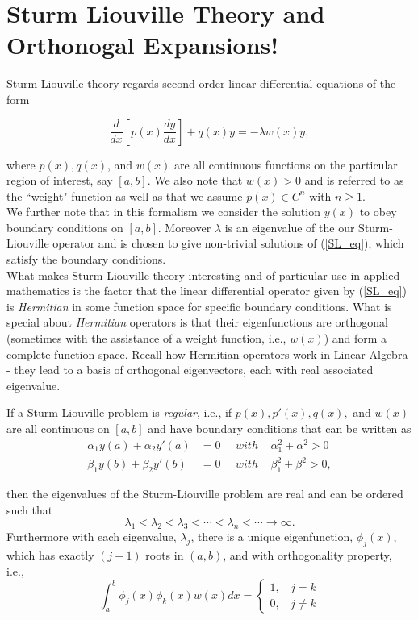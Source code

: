 \graphicspath{{./Sturm_Liouville/}}

\section{Sturm Liouville Theory and Orthonogal Expansions!}

Sturm-Liouville theory regards second-order linear differential equations of the form

\begin{equation}
\label{SL_eq} \frac{d}{dx} \left[ p(x) \frac{dy}{dx} \right] + q(x) y = -\lambda w(x) y,
\end{equation} 

where $p(x), q(x)$, and $w(x)$ are  all continuous functions on the particular region of interest, say $[a,b]$. We also note that $w(x)>0$ and is referred to as the ``weight" function as well as that we assume $p(x)\in C^n$ with $n\geq 1$.\\

We further note that in this formalism we consider the solution $y(x)$ to obey boundary conditions on $[a,b]$. Moreover $\lambda$ is an eigenvalue of the our Sturm-Liouville operator and is chosen to give non-trivial solutions of (\ref{SL_eq}), which satisfy the boundary conditions.   \\

What makes Sturm-Liouville theory interesting and of particular use in applied mathematics is the factor that the linear differential operator given by (\ref{SL_eq}) is \emph{Hermitian} in some function space for specific boundary conditions.  What is special about \emph{Hermitian} operators is that their eigenfunctions are orthogonal (sometimes with the assistance of a weight function, i.e., $w(x)$) and form a complete function space. Recall how Hermitian operators work in Linear Algebra - they lead to a basis of orthogonal eigenvectors, each with real associated eigenvalue. \\


\begin{theorem}
\label{SL_theorem} If a Sturm-Liouville problem is \emph{regular}, i.e., if $p(x), p'(x), q(x),$ and $w(x)$ are all continuous on $[a,b]$ and have boundary conditions that can be written as 
\begin{align}
\label{SL_bcs} \alpha_1 y(a) + \alpha_2 y'(a) &= 0 \ \ \ \ \ \ with \ \ \ \ \ \alpha_1^2+\alpha^2>0 \\
\beta_1 y(b) + \beta_2 y'(b) &= 0 \ \ \ \ \ \ with \ \ \ \ \ \beta_1^2+\beta^2>0, 
\end{align}

then the eigenvalues of the Sturm-Liouville problem are real and can be ordered such that
$$\lambda_1 < \lambda_2 < \lambda_3 < \cdots < \lambda_n < \cdots \rightarrow \infty.$$
Furthermore with each eigenvalue, $\lambda_j$, there is a unique eigenfunction, $\phi_j(x)$, which has exactly $(j-1)$ roots in $(a,b)$, and with orthogonality property, i.e., 
$$\int_a^b \phi_j(x) \phi_k(x) w(x) dx =\left\{ \begin{array}{c} 
1,  \ \ \ \ j=k \\
0, \ \ \ \ j\neq k \end{array} \right.$$
\end{theorem}


